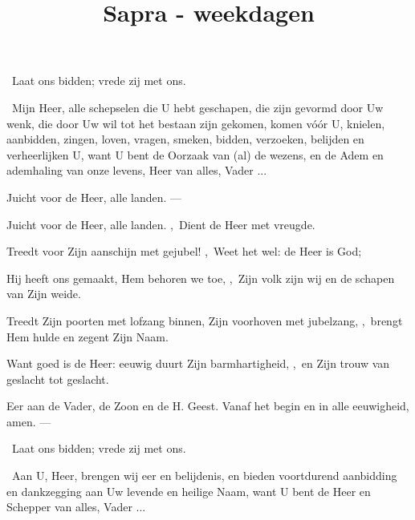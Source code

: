 \documentclass[12pt,twoside,a5paper]{article}
\begin{document}
\title{Sapra - weekdagen}
\author{}
\date{}
\maketitle


\dd\ Laat ons bidden; vrede zij met ons.

\cc\ Mijn Heer, alle schepselen die U hebt geschapen, die zijn gevormd door Uw wenk, die door Uw wil tot het bestaan zijn gekomen, komen vóór U, knielen, aanbidden, zingen, loven, vragen, smeken, bidden, verzoeken, belijden en verheerlijken U, want U bent de Oorzaak van (al) de wezens, en de Adem en ademhaling van onze levens, Heer van alles, Vader ...


\begin{halfparskip}
   Juicht voor de Heer, alle landen. --- 

  Juicht voor de Heer, alle landen. \sep\ Dient de Heer met vreugde.

  Treedt voor Zijn aanschijn met gejubel! \sep\ Weet het wel: de Heer is God;

  Hij heeft ons gemaakt, Hem behoren we toe, \sep\ Zijn volk zijn wij en de schapen van Zijn weide.

  Treedt Zijn poorten met lofzang binnen, Zijn voorhoven met jubelzang, \sep\ brengt Hem hulde en zegent Zijn Naam.

  Want goed is de Heer: eeuwig duurt Zijn barmhartigheid, \sep\ en Zijn trouw van geslacht tot geslacht.

  Eer aan de Vader, de Zoon en de H. Geest. Vanaf het begin en in alle eeuwigheid, amen. --- 
\end{halfparskip}

\dd\ Laat ons bidden; vrede zij met ons.

\cc\ Aan U, Heer, brengen wij eer en belijdenis, en bieden voortdurend aanbidding en dankzegging aan Uw levende en heilige Naam, want U bent de Heer en Schepper van alles, Vader ...
\end{document}

